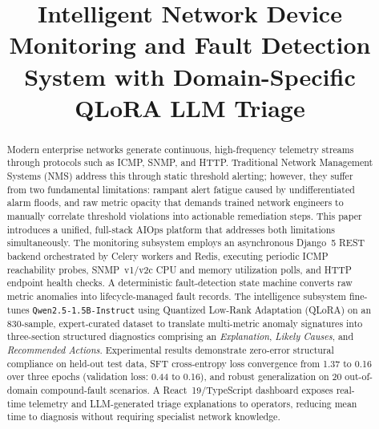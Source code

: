 \documentclass[conference]{IEEEtran}
\begin{document}
\title{Intelligent Network Device Monitoring and Fault Detection System with Domain-Specific QLoRA LLM Triage}

\author{%
}

\maketitle

\begin{abstract}
Modern enterprise networks generate continuous, high-frequency telemetry streams through protocols such as ICMP, SNMP, and HTTP. Traditional Network Management Systems (NMS) address this through static threshold alerting; however, they suffer from two fundamental limitations: rampant alert fatigue caused by undifferentiated alarm floods, and raw metric opacity that demands trained network engineers to manually correlate threshold violations into actionable remediation steps. This paper introduces a unified, full-stack AIOps platform that addresses both limitations simultaneously. The monitoring subsystem employs an asynchronous Django~5 REST backend orchestrated by Celery workers and Redis, executing periodic ICMP reachability probes, SNMP~v1/v2c CPU and memory utilization polls, and HTTP endpoint health checks. A deterministic fault-detection state machine converts raw metric anomalies into lifecycle-managed fault records. The intelligence subsystem fine-tunes \texttt{Qwen2.5-1.5B-Instruct} using Quantized Low-Rank Adaptation (QLoRA) on an 830-sample, expert-curated dataset to translate multi-metric anomaly signatures into three-section structured diagnostics comprising an \textit{Explanation}, \textit{Likely Causes}, and \textit{Recommended Actions}. Experimental results demonstrate zero-error structural compliance on held-out test data, SFT cross-entropy loss convergence from 1.37 to 0.16 over three epochs (validation loss: 0.44 to 0.16), and robust generalization on 20 out-of-domain compound-fault scenarios. A React~19/TypeScript dashboard exposes real-time telemetry and LLM-generated triage explanations to operators, reducing mean time to diagnosis without requiring specialist network knowledge.
\end{abstract}
\end{document}
